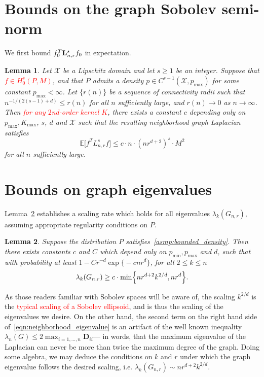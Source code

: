 \documentclass{article}
\newcommand{\1}{\mathbf{1}}
\newcommand{\Lap}{{\bf L}}
\newcommand{\Xset}{\mathcal{X}}
\newcommand{\Ebb}{\mathbb{E}}
\theoremstyle{alden}
\theoremstyle{aldenthm}
\newtheorem{lemma}{Lemma}
\theoremstyle{definition}
\theoremstyle{remark}
\begin{document}
\section{Bounds on the graph Sobolev semi-norm}
\label{sec:graph_sobolev_seminorm}
We first bound $f_0^T \Lap_{n,r}^s f_0$ in expectation.
\begin{lemma}
	\label{lem:roughness_functional_expectation_sobolev}
	Let $\Xset$ be a Lipschitz domain and let $s \geq 1$ be an integer. Suppose that \textcolor{red}{$f \in H_0^{s}(P,M)$}, and that $P$ admits a density $p \in C^{s-1}(\Xset,p_{\max})$ for some constant $p_{\max} < \infty$. Let $\{r(n)\}$ be a sequence of connectivity radii such that $n^{-1/(2(s - 1) + d)} \leq r(n)$ for all $n$ sufficiently large, and $r(n) \to 0$ as $n \to \infty$. Then \textcolor{red}{for any $2$nd-order kernel $K$}, there exists a constant $c$ depending only on $p_{\max}, K_{\max}$, $s$, $d$ and $\Xset$ such that the resulting neighborhood graph Laplacian satisfies
	\begin{equation}
	\label{eqn:roughness_functional_expectation_sobolev}
	\Ebb\bigl[f^T L_{n,r}^s f\bigr] \leq c \cdot n \cdot (nr^{d+2})^s \cdot M^2
	\end{equation}
	for all $n$ sufficiently large.
\end{lemma}

\section{Bounds on graph eigenvalues}
\label{sec:graph_eigenvalues}
Lemma~\ref{lem:neighborhood_eigenvalue} establishes a scaling rate which holds for all eigenvalues $\lambda_{k}(G_{n,r})$, assuming appropriate regularity conditions on $P$.
\begin{lemma}
	\label{lem:neighborhood_eigenvalue}
	Suppose the distribution $P$ satisfies~\ref{asmp:bounded_density}. Then there exists constants $c$ and $C$ which depend only on $p_{\min}, p_{\max}$ and $d$, such that with probability at least $1 - C r^{-d} \exp\bigl\{- c n r^d\bigr\}$, for all $2 \leq k \leq n$
	\begin{equation}
	\label{eqn:neighborhood_eigenvalue}
	\lambda_k(G_{n,r}) \geq c \cdot \min\Bigl\{nr^{d + 2}k^{2/d}, nr^d\Bigr\}.
	\end{equation}	
\end{lemma}
As those readers familiar with Sobolev spaces will be aware of, the scaling $k^{2/d}$ is the \textcolor{red}{typical scaling of a Sobolev ellipsoid}, and is thus the scaling of the eigenvalues we desire. On the other hand, the second term on the right hand side of~\eqref{eqn:neighborhood_eigenvalue} is an artifact of the well known inequality $\lambda_n(G) \leq 2 \max_{i = 1,\ldots,n} \mathbf{D}_{ii}$--- in words, that the maximum eigenvalue of the Laplacian can never be more than twice the maximum degree of the graph. Doing some algebra, we may deduce the conditions on $k$ and $r$ under which the graph eigenvalue follows the desired scaling, i.e. $\lambda_k(G_{n,r}) \sim n r^{d + 2}k^{2/d}$. 
\end{document}
